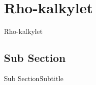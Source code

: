 \section{Rho-kalkylet}
\begin{frame}{Rho-kalkylet}

\end{frame}

\subsection{Sub Section}
\begin{frame}{Sub Section}{Subtitle}

\end{frame}